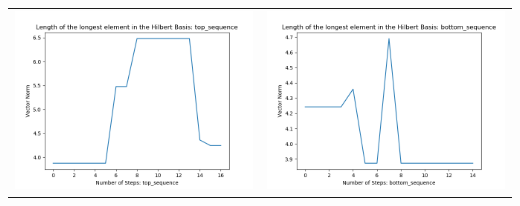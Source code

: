 \documentclass[10pt]{article}
\begin{document}
\begin{tabular}{c|c}
\begin{minipage}{.4\textwidth}
\includegraphics[width=\textwidth]{"DATA/4d/5 generators 2 bound D/top_sequence LENGTH"}
\end{minipage} &
\begin{minipage}{.4\textwidth}
\includegraphics[width=\textwidth]{"DATA/4d/5 generators 2 bound D bottomup/bottom_sequence LENGTH"}
\end{minipage}
\end{tabular}
\end{document}
